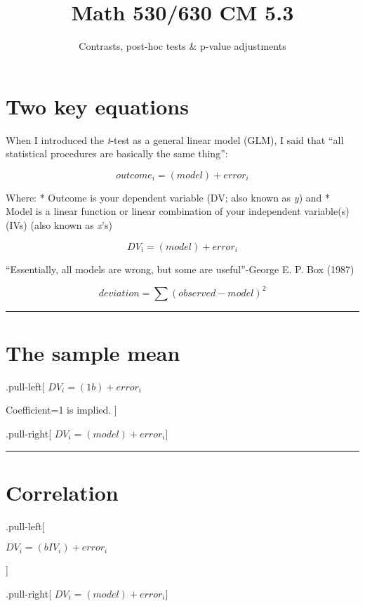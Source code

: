 \documentclass[]{article}
\title{Math 530/630 CM 5.3}
\subtitle{Contrasts, post-hoc tests \& p-value adjustments}
\author{}
\date{}
\begin{document}
\maketitle

\hypertarget{two-key-equations}{%
\section{Two key equations}\label{two-key-equations}}

When I introduced the \emph{t}-test as a general linear model (GLM), I
said that ``all statistical procedures are basically the same thing'':

\[outcome_i=(model)+error_i\]

Where: * Outcome is your dependent variable (DV; also known as \emph{y})
and * Model is a linear function or linear combination of your
independent variable(s) (IVs) (also known as \emph{x}'s)

\[DV_i=(model)+error_i\]

``Essentially, all models are wrong, but some are useful''-George E. P.
Box (1987)

\[deviation=\sum{(observed-model)^2}\]

\begin{center}\rule{0.5\linewidth}{\linethickness}\end{center}

\hypertarget{the-sample-mean}{%
\section{The sample mean}\label{the-sample-mean}}

.pull-left{[} \(DV_i=(1b)+error_i\)

Coefficient=1 is implied. {]}

.pull-right{[} \(DV_i=(model)+error_i\){]}

\begin{center}\rule{0.5\linewidth}{\linethickness}\end{center}

\hypertarget{correlation}{%
\section{Correlation}\label{correlation}}

.pull-left{[}

\(DV_i=(bIV_i)+error_i\)

{]}

.pull-right{[} \(DV_i=(model)+error_i\){]}
\end{document}
